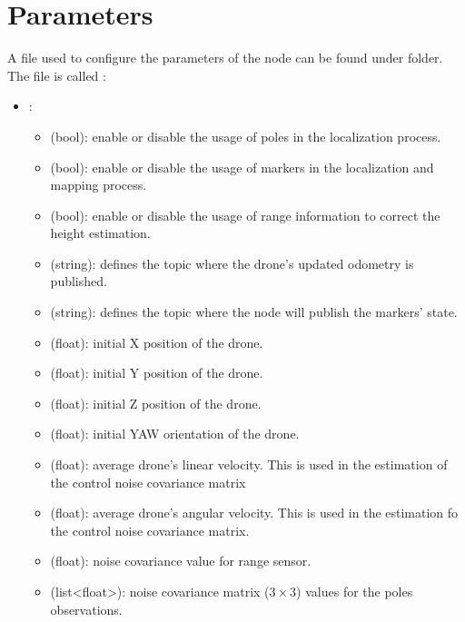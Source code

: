 \section*{Parameters}
A file used to configure the parameters of the node can be found under  folder. The file is called :
\begin{itemize}
    \item{:
        \begin{itemize}
            \item{ (bool): enable or disable the usage of poles in the localization process.}
            \item{ (bool): enable or disable the usage of markers in the localization and mapping process.}
            \item{ (bool): enable or disable the usage of range information to correct the height estimation.}
            \item{ (string): defines the topic where the drone's updated odometry is published.}
            \item{ (string): defines the topic where the node will publish the markers' state.}
            \item{ (float): initial X position of the drone.}
            \item{ (float): initial Y position of the drone.}
            \item{ (float): initial Z position of the drone.}
            \item{ (float): initial YAW orientation of the drone.}
            \item{ (float): average drone's linear velocity. This is used in the estimation of the control noise covariance matrix}
            \item{ (float): average drone's angular velocity. This is used in the estimation fo the control noise covariance matrix.}
            \item{ (float): noise covariance value for range sensor.}
            \item{ (list<float>): noise covariance matrix ($3\times 3$) values for the poles observations.}

\end{itemize}}
\end{itemize}
